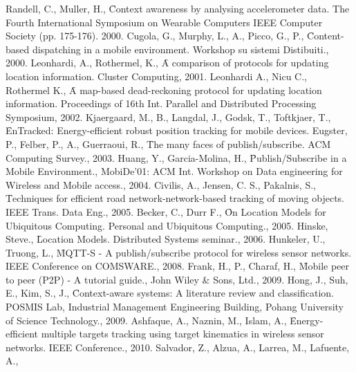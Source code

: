 \begin{thebibliography}{100}
    \setlength{\itemindent}{-1cm}
    \setlength\itemsep{0pt}
    \setlength{\parskip}{0pt}

     Randell, C., Muller, H., \f{Context awareness by analysing accelerometer
        data}. The Fourth International Symposium on Wearable Computers IEEE Computer
        Society (pp. 175-176). 2000.
     Cugola, G., Murphy, L., A., Picco, G., P., \f{Content-based
        dispatching in a mobile environment}. Workshop su
        sistemi Distibuiti., 2000.
     Leonhardi, A., Rothermel, K., \f{A comparison of protocols for updating
        location information}. Cluster Computing, 2001.
     Leonhardi A., Nicu C., Rothermel K., \f{A map-based dead-reckoning
        protocol for updating location information}. Proceedings of 16th Int. Parallel and
        Distributed Processing Symposium, 2002.
     Kjaergaard, M., B., Langdal, J., Godsk, T., Toftkjaer, T., \f{EnTracked:
        Energy-efficient robust position tracking for mobile devices}.
     Eugster, P., Felber, P., A., Guerraoui, R., \f{The many faces of
        publish/subscribe}. ACM Computing Survey., 2003.
     Huang, Y., Garcia-Molina, H., \f{Publish/Subscribe in a Mobile
        Environment}., MobiDe'01: ACM Int.
        Workshop on Data engineering for Wireless and Mobile access., 2004.
     Civilis, A., Jensen, C. S., Pakalnis, S., \f{Techniques for efficient
        road network-network-based tracking of moving objects}. IEEE Trans. Data Eng., 2005.
     Becker, C., Durr F., \f{On Location Models for Ubiquitous Computing}.
        Personal and Ubiquitous Computing., 2005.
     Hinske, Steve., \f{Location Models}. Distributed Systems seminar., 2006.
     Hunkeler, U., Truong, L., \f{MQTT-S - A publish/subscribe protocol
        for wireless sensor networks}. IEEE Conference on COMSWARE., 2008.
     Frank, H., P., Charaf, H., \f{Mobile peer to peer (P2P) - A tutorial guide}.,
        John Wiley \& Sons, Ltd., 2009.
     Hong, J., Suh, E., Kim, S., J., \f{Context-aware systems: A literature
        review and classification}. POSMIS Lab, Industrial Management Engineering Building,
        Pohang University of Science Technology., 2009.
     Ashfaque, A., Naznin, M., Islam, A., \f{Energy-efficient multiple
        targets tracking using target kinematics in wireless sensor networks}. IEEE
        Conference., 2010.
     Salvador, Z., Alzua, A., Larrea, M., Lafuente, A.,

\end{thebibliography}
